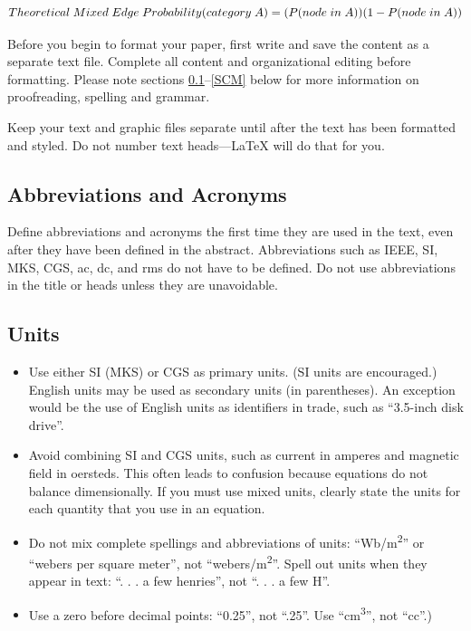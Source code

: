 \documentclass[conference]{IEEEtran}
\begin{document}
\begin{equation}
    Theoretical\; Mixed\; Edge\; Probability(category\; A)
    \\
    = (P(node\; in\;A)) (1 - P(node\;in\;A))\label{eq}
\end{equation}

Before you begin to format your paper, first write and save the content as a 
separate text file. Complete all content and organizational editing before 
formatting. Please note sections \ref{AA}--\ref{SCM} below for more information on 
proofreading, spelling and grammar.

Keep your text and graphic files separate until after the text has been 
formatted and styled. Do not number text heads---{\LaTeX} will do that 
for you.

\subsection{Abbreviations and Acronyms}\label{AA}
Define abbreviations and acronyms the first time they are used in the text, 
even after they have been defined in the abstract. Abbreviations such as 
IEEE, SI, MKS, CGS, ac, dc, and rms do not have to be defined. Do not use 
abbreviations in the title or heads unless they are unavoidable.

\subsection{Units}
\begin{itemize}
\item Use either SI (MKS) or CGS as primary units. (SI units are encouraged.) English units may be used as secondary units (in parentheses). An exception would be the use of English units as identifiers in trade, such as ``3.5-inch disk drive''.
\item Avoid combining SI and CGS units, such as current in amperes and magnetic field in oersteds. This often leads to confusion because equations do not balance dimensionally. If you must use mixed units, clearly state the units for each quantity that you use in an equation.
\item Do not mix complete spellings and abbreviations of units: ``Wb/m\textsuperscript{2}'' or ``webers per square meter'', not ``webers/m\textsuperscript{2}''. Spell out units when they appear in text: ``. . . a few henries'', not ``. . . a few H''.
\item Use a zero before decimal points: ``0.25'', not ``.25''. Use ``cm\textsuperscript{3}'', not ``cc''.)
\end{itemize}
\end{document}
